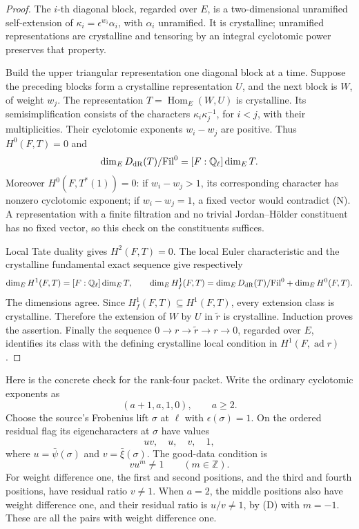\begin{proof}
The \(i\)-th diagonal block, regarded over \(E\), is a
two-dimensional unramified self-extension of
\(\kappa_i=\epsilon^{w_i}\alpha_i\), with \(\alpha_i\) unramified.
It is crystalline; unramified representations are crystalline
and tensoring by an integral cyclotomic power preserves that property.

Build the upper triangular representation one diagonal block at a time.
Suppose the preceding blocks form a crystalline representation \(U\),
and the next block is \(W\), of weight \(w_j\).
The representation \(T=\operatorname{Hom}_E(W,U)\) is crystalline.
Its semisimplification consists of the characters
\(\kappa_i\kappa_j^{-1}\), for \(i<j\), with their multiplicities.
Their cyclotomic exponents \(w_i-w_j\) are positive.
Thus \(H^0(F,T)=0\) and
\[
      \dim_E D_{\rm dR}(T)/\mathrm{Fil}^0
                          =[F:\mathbb Q_\ell]\dim_E T.
\]
Moreover \(H^0(F,T^*(1))=0\): if \(w_i-w_j>1\), its corresponding
character has nonzero cyclotomic exponent; if \(w_i-w_j=1\),
a fixed vector would contradict (N).
A representation with a finite filtration and no trivial
Jordan--Hölder constituent has no fixed vector, so this check on
the constituents suffices.

Local Tate duality gives \(H^2(F,T)=0\).
The local Euler characteristic and the crystalline fundamental
exact sequence give respectively
\[
 \dim_E H^1(F,T)=[F:\mathbb Q_\ell]\dim_E T,\qquad
 \dim_E H^1_f(F,T)
       =\dim_E D_{\rm dR}(T)/\mathrm{Fil}^0+\dim_E H^0(F,T).
\]
The dimensions agree. Since \(H^1_f(F,T)\subseteq H^1(F,T)\),
every extension class is crystalline.
Therefore the extension of \(W\) by \(U\) in \(\widetilde r\)
is crystalline. Induction proves the assertion.
Finally the sequence
\(0\to r\to\widetilde r\to r\to0\), regarded over \(E\),
identifies its class with the defining crystalline local
condition in \(H^1(F,\operatorname{ad}r)\).
\end{proof}

Here is the concrete check for the rank-four packet.
Write the ordinary cyclotomic exponents as
\[
                         (a+1,a,1,0),\qquad a\geq2.
\]
Choose the source's Frobenius lift \(\sigma\) at \(\ell\) with
\(\epsilon(\sigma)=1\).
On the ordered residual flag its eigencharacters at \(\sigma\)
have values
\[
                              uv,\quad u,\quad v,\quad1,
\]
where \(u=\bar\psi(\sigma)\) and \(v=\bar\xi(\sigma)\).
The good-data condition is
\[
                              vu^m\ne1\qquad(m\in\mathbb Z).
 \tag{D}
\]
For weight difference one, the first and second positions, and the
third and fourth positions, have residual ratio \(v\ne1\).
When \(a=2\), the middle positions also have weight difference one,
and their residual ratio is \(u/v\ne1\), by (D) with \(m=-1\).
These are all the pairs with weight difference one.

